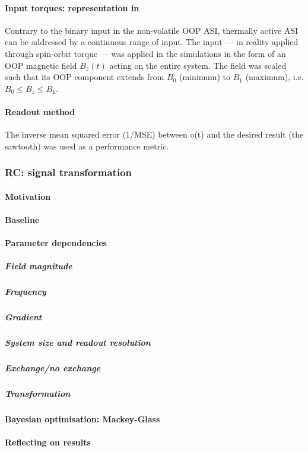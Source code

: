 \paragraph{Input torques: representation in \hotspice}
Contrary to the binary input in the non-volatile OOP ASI, thermally active ASI can be addressed by a continuous range of input.
The input --- in reality applied through spin-orbit torque --- was applied in the simulations in the form of an OOP magnetic field $B_z(t)$ acting on the entire system.
The field was scaled such that its OOP component extends from $B_0$ (minimum) to $B_1$ (maximum), i.e. $B_0 \leq B_z \leq B_1$.

\paragraph{Readout method}
The inverse mean squared error (1/MSE) between o(t) and the desired result (the sawtooth) was used as a performance metric.

\subsubsection{RC: signal transformation}
\paragraph{Motivation} %
\paragraph{Baseline}
\paragraph{Parameter dependencies}
\subparagraph{Field magnitude}
\subparagraph{Frequency}
\subparagraph{Gradient}
\subparagraph{System size and readout resolution}
\subparagraph{Exchange/no exchange}
\subparagraph{Transformation}
\paragraph{Bayesian optimisation: Mackey-Glass}
\paragraph{Reflecting on results} %
